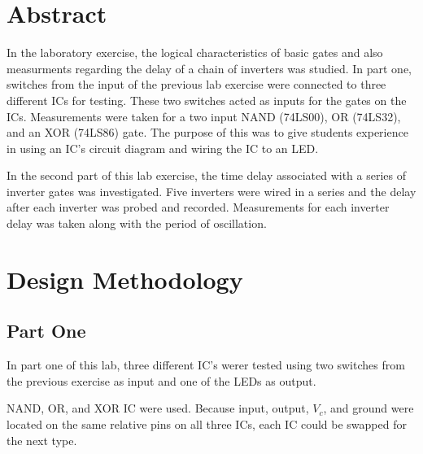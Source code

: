 \documentclass[CMPE]{KGCOEReport}
\begin{document}
\maketitle

\section*{Abstract}
In the laboratory exercise, the logical characteristics of basic gates and also measurments regarding the delay of a chain of inverters was studied. In part one, switches from the input of the previous lab exercise were connected to three different ICs for testing. These two switches acted as inputs for the gates on the ICs. Measurements were taken for a two input NAND (74LS00), OR (74LS32), and an XOR (74LS86) gate. The purpose of this was to give students experience in using an IC's circuit diagram and wiring the IC to an LED. \par 
In the second part of this lab exercise, the time delay associated with a series of inverter gates was investigated. Five inverters were wired in a series and the delay after each inverter was probed and recorded. Measurements for each inverter delay was taken along with the period of oscillation.

\section*{Design Methodology}

\subsection*{Part One}
In part one of this lab, three different IC's werer tested using two switches from the previous exercise as input and one of the LEDs as output. \par
NAND, OR, and XOR IC were used. Because input, output, \(V_c\), and ground were located on the same relative pins on all three ICs, each IC could be swapped for the next type.
\end{document}
